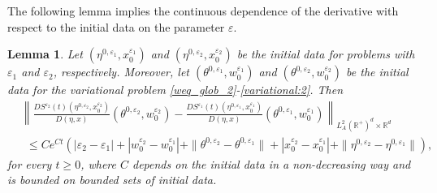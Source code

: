 \documentclass[11pt, leqno]{amsart}
\newtheorem{lem}[thm]{Lemma}
\theoremstyle{definition}
\def\R{\mathbb{R}}
\begin{document}
The following lemma implies the continuous dependence of the derivative with respect to the initial data on the parameter $\varepsilon$. 	
	
\begin{lem}\label{est:variational}
		Let $(\eta^{0,\varepsilon_1},x^{\varepsilon_1}_0)$ and $(\eta^{0,\varepsilon_2},x^{\varepsilon_2}_0)$ be the initial data for problems with $\varepsilon_1$ and $\varepsilon_2$, respectively. Moreover, let $(\theta^{0,\varepsilon_1},w^{\varepsilon_1}_0)$ and $(\theta^{0,\varepsilon_2},w^{\varepsilon_2}_0)$
	be the initial data for the variational problem \eqref{weq_glob_2}-\eqref{variational:2}. Then
	\begin{align*}
	& \left\|\frac{DS^{\varepsilon_2}(t)(\eta^{0,\varepsilon_2},x^{\varepsilon_2}_0)}{D(\eta,x)}(\theta^{0,\varepsilon_2},w^{\varepsilon_2}_0)
	-\frac{DS^{\varepsilon_1}(t)(\eta^{0,\varepsilon_1},x^{\varepsilon_1}_0)}{D(\eta,x)}(\theta^{0,\varepsilon_1},w^{\varepsilon_1}_0)\right\|_{ L^2_A(\R^+)^d\times \R^d}\\
	& \ \ \leq Ce^{Ct}(|\varepsilon_2-\varepsilon_1|+|w^{\varepsilon_2}_0-w^{\varepsilon_1}_0|+ \|\theta^{0,\varepsilon_2}-\theta^{0,\varepsilon_1}\|+|x^{\varepsilon_2}_0-x^{\varepsilon_1}_0| +\|\eta^{0,\varepsilon_2}-\eta^{0,\varepsilon_1}\|),
	\end{align*}
	for every $t\geq 0$, where $C$ depends on the initial data in a non-decreasing way and is bounded on bounded sets of initial data.
\end{lem}
\end{document}
